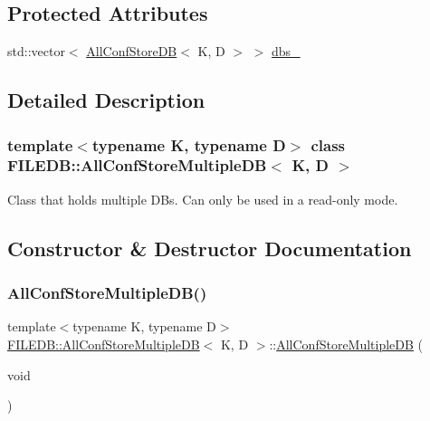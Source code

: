 \subsection*{Protected Attributes}
\begin{DoxyCompactItemize}
\item 
std\+::vector$<$ \mbox{\hyperlink{classFILEDB_1_1AllConfStoreDB}{All\+Conf\+Store\+DB}}$<$ K, D $>$ $>$ \mbox{\hyperlink{classFILEDB_1_1AllConfStoreMultipleDB_ae3a7f9bd3ad0f4bb998e8880b81305c2}{dbs\+\_\+}}
\end{DoxyCompactItemize}


\subsection{Detailed Description}
\subsubsection*{template$<$typename K, typename D$>$\newline
class F\+I\+L\+E\+D\+B\+::\+All\+Conf\+Store\+Multiple\+D\+B$<$ K, D $>$}

Class that holds multiple D\+Bs. Can only be used in a read-\/only mode. 

\subsection{Constructor \& Destructor Documentation}
\mbox{\label{classFILEDB_1_1AllConfStoreMultipleDB_a0c45fce64168ca576e875747eb599927}} 
\subsubsection{\texorpdfstring{AllConfStoreMultipleDB()}{AllConfStoreMultipleDB()}\hspace{0.1cm}{\footnotesize\ttfamily [1/2]}}
{\footnotesize\ttfamily template$<$typename K, typename D$>$ \\
\mbox{\hyperlink{classFILEDB_1_1AllConfStoreMultipleDB}{F\+I\+L\+E\+D\+B\+::\+All\+Conf\+Store\+Multiple\+DB}}$<$ K, D $>$\+::\mbox{\hyperlink{classFILEDB_1_1AllConfStoreMultipleDB}{All\+Conf\+Store\+Multiple\+DB}} (\begin{DoxyParamCaption}\item[{void}]{ }\end{DoxyParamCaption})\hspace{0.3cm}{\ttfamily [inline]}}

